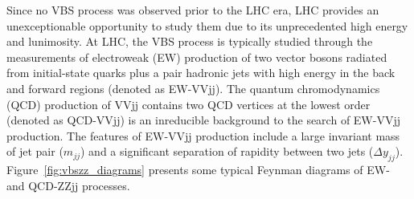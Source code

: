 Since no VBS process was observed prior to the LHC era, LHC provides an unexceptionable opportunity to study them due to its unprecedented high energy and lunimosity.
At LHC, the VBS process is typically studied through the measurements of electroweak (EW) production of two vector bosons radiated from initial-state quarks 
plus a pair hadronic jets with high energy in the back and forward regions (denoted as EW-VVjj).
The quantum chromodynamics (QCD) production of VVjj contains two QCD vertices at the lowest order (denoted as QCD-VVjj) is an inreducible background to the search of EW-VVjj production.
The features of EW-VVjj production include a large invariant mass of jet pair ($m_{jj}$) and a significant separation of rapidity between two jets ($\Delta y_{jj}$).
Figure~\ref{fig:vbszz_diagrams} presents some typical Feynman diagrams of EW- and QCD-ZZjj processes.
